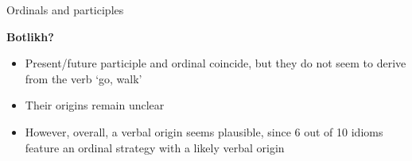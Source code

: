 \begin{frame}{Ordinals and participles}
\begin{center}
    \textbf{Botlikh?}
\begin{itemize}
    \item Present/future participle and ordinal coincide, but they do not seem to derive from the verb `go, walk'
    \item Their origins remain unclear
    \item However, overall, a verbal origin seems plausible, since 6 out of 10 idioms feature an ordinal strategy with a likely verbal origin
\end{itemize}
\end{center}
    
\end{frame}


